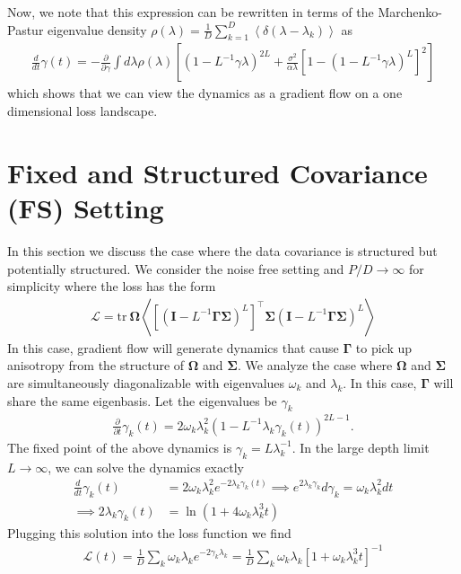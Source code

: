 \documentclass{article} %
\begin{document}
Now, we note that this expression can be rewritten in terms of the Marchenko-Pastur eigenvalue density $\rho(\lambda) = \frac{1}{D} \sum_{k=1}^D \left< \delta(\lambda - \lambda_k) \right>$ as
\begin{align}
    \frac{d}{dt} \gamma(t) =  -\frac{\partial}{\partial \gamma }  \int d\lambda \rho(\lambda) \left[ \left( 1 -  L^{-1} \gamma  \lambda \right)^{2L} + \frac{\sigma^2}{\alpha \lambda}  \left[ 1 -  \left( 1 - L^{-1} \gamma \lambda \right)^L \right]^2  \right]
\end{align}
which shows that we can view the dynamics as a gradient flow on a one dimensional loss landscape. 

\section{Fixed and Structured Covariance (\textbf{FS}) Setting}\label{app:FS_setting}

In this section we discuss the case where the data covariance is structured but potentially structured. We consider the noise free setting and $P/D \to \infty$ for simplicity where the loss has the form
\begin{align}
    \mathcal L =  \text{tr} \ \bm\Omega \left< \left[\left( \bm I - L^{-1} \bm\Gamma {\bm\Sigma} \right)^L \right]^\top \bm\Sigma \left( \bm I - L^{-1} \bm\Gamma {\bm\Sigma} \right)^L \right>
\end{align}
In this case, gradient flow will generate dynamics that cause $\bm\Gamma$ to pick up anisotropy from the structure of $\bm\Omega$ and $\bm\Sigma$. We analyze the case where $\bm\Omega$ and $\bm\Sigma$ are simultaneously diagonalizable with eigenvalues $\omega_k$ and $\lambda_k$. In this case, $\bm\Gamma$ will share the same eigenbasis. Let the eigenvalues be $\gamma_k$
\begin{align}
    \frac{\partial}{\partial t} \gamma_k(t) = 2  \omega_k \lambda_k^2 \left( 1 - L^{-1} \lambda_k \gamma_k(t) \right)^{2L-1} .
\end{align}
The fixed point of the above dynamics is $\gamma_k = L \lambda_k^{-1}$. In the large depth limit $L \to \infty$, we can solve the dynamics exactly
\begin{align}
    \frac{d}{dt} \gamma_k(t) &=   2 \omega_k \lambda_k^2 e^{-2 \lambda_k \gamma_k(t) } \implies e^{2  \lambda_k \gamma_k} d\gamma_k = \omega_k \lambda_k^2 dt  \nonumber
    \\
    \implies 2  \lambda_k \gamma_k(t)  &=  \ln( 1 + 4 \omega_k \lambda_k^3 t )
\end{align}
Plugging this solution into the loss function we find
\begin{align}
    \mathcal L(t) = \frac{1}{D} \sum_k \omega_k \lambda_k e^{-2 \gamma_k \lambda_k} =  \frac{1}{D} \sum_k \omega_k \lambda_k [ 1 + \omega_k \lambda_k^3 t ]^{-1}
\end{align}
\end{document}
